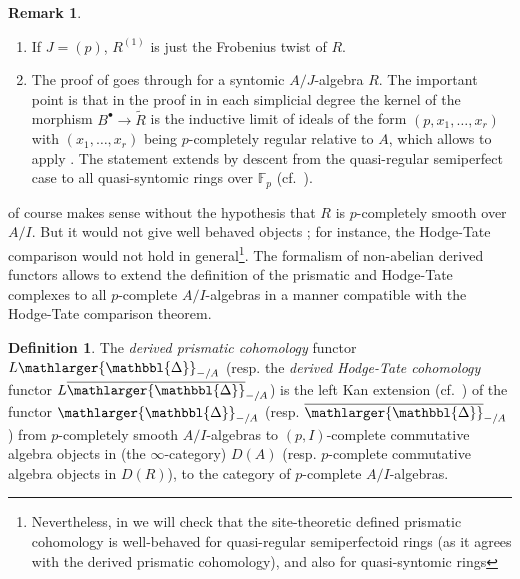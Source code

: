 \documentclass{amsart}
\newcommand{\prism}{{\mathlarger{\mathbbl{\Delta}}}}
\theoremstyle{plain}
\theoremstyle{definition}
\newtheorem{definition}[theorem]{Definition}
\newtheorem{remark}[theorem]{Remark}
\newcommand{\F}{\mathbb{F}}
\begin{document}
\begin{remark}
  \label{sec:prism-site-prism-remarks-after-crystalline-comparison}
  \begin{enumerate}
  \item If $J=(p)$, $R^{(1)}$ is just the Frobenius twist of $R$.
  \item The proof of  goes through for a syntomic $A/J$-algebra $R$. The important point is that in the proof in \cite[Theorem 5.2]{bhatt_scholze_prisms_and_prismatic_cohomology} in each simplicial degree the kernel of the morphism $B^\bullet\to \tilde{R}$ is the inductive limit of ideals of the form $(p,x_1,\ldots, x_r)$ with $(x_1,\ldots, x_r)$ being $p$-completely regular relative to $A$, which allows to apply \cite[Proposition 3.13]{bhatt_scholze_prisms_and_prismatic_cohomology}. The statement extends by descent from the quasi-regular semiperfect case to all quasi-syntomic rings over $\F_p$ (cf.\ ).
  \end{enumerate}

\end{remark}

 of course makes sense without the hypothesis that $R$ is $p$-completely smooth over $A/I$. But it would not give well behaved objects ; for instance, the Hodge-Tate comparison would not hold in general\footnote{Nevertheless, in  we will check that the site-theoretic defined prismatic cohomology is well-behaved for quasi-regular semiperfectoid rings (as it agrees with the derived prismatic cohomology), and also for quasi-syntomic rings}. The formalism of non-abelian derived functors allows to extend the definition of the prismatic and Hodge-Tate complexes to all $p$-complete $A/I$-algebras in a manner compatible with the Hodge-Tate comparison theorem.

\begin{definition}
\label{sec:def-prism-cohom-general} 
The \textit{derived prismatic cohomology} functor $L\prism_{-/A}$ (resp. the \textit{derived Hodge-Tate cohomology} functor $L\overline{\prism}_{-/A}$) is the left Kan extension (cf.\ \cite[Construction 2.1]{bhatt_morrow_scholze_topological_hochschild_homology}) of the functor $\prism_{-/A}$ (resp. $\overline{\prism}_{-/A}$) from $p$-completely smooth $A/I$-algebras to $(p,I)$-complete commutative algebra objects in (the $\infty$-category) $D(A)$ (resp. $p$-complete commutative algebra objects in $D(R)$), to the category of $p$-complete $A/I$-algebras.  
\end{definition}
\end{document}
